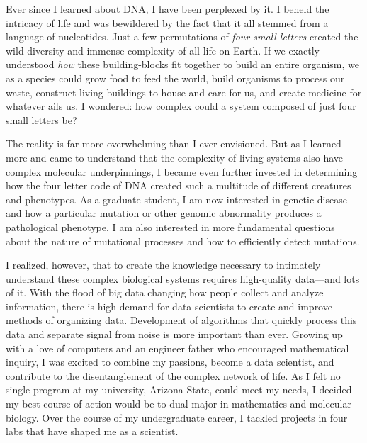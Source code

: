\documentclass[12pt]{article}
\begin{document}
Ever since I learned about DNA, I have been perplexed by it. I beheld the intricacy of life and was bewildered by the fact that it all stemmed from a language of nucleotides. Just a few permutations of \textit{four small letters} created the wild diversity and immense complexity of all life on Earth. If we exactly understood \textit{how} these building-blocks fit together to build an entire organism, we as a species could grow food to feed the world, build organisms to process our waste, construct living buildings to house and care for us, and create medicine for whatever ails us. I wondered: how complex could a system composed of just four small letters be?

The reality is far more overwhelming than I ever envisioned.
But as I learned more and came to understand that the complexity of living systems also have complex molecular underpinnings, I became even further invested in determining how the four letter code of DNA created such a multitude of different creatures and phenotypes.
As a graduate student, I am now interested in genetic disease and how a particular mutation or other genomic abnormality produces a pathological phenotype. I am also interested in more fundamental questions about the nature of mutational processes and how to efficiently detect mutations.


I realized, however, that to create the knowledge necessary to intimately understand these complex biological systems requires high-quality data---and lots of it. With the flood of big data changing how people collect and analyze information, there is high demand for data scientists to create and improve methods of organizing data. Development of algorithms that quickly process this data and separate signal from noise is more important than ever. Growing up with a love of computers and an engineer father who encouraged mathematical inquiry, I was excited to combine my passions, become a data scientist, and contribute to the disentanglement of the complex network of life. As I felt no single program at my university, Arizona State, could meet my needs, I decided my best course of action would be to dual major in mathematics and molecular biology. Over the course of my undergraduate career, I tackled projects in four labs that have shaped me as a scientist.
\end{document}
